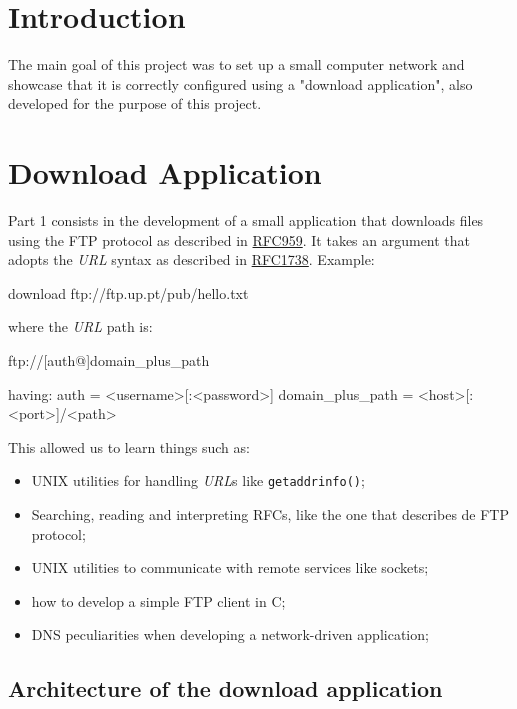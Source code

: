 \section{Introduction}

The main goal of this project was to set up a small computer network and showcase that it is correctly configured using a "download application", also developed for the purpose of this project.

\section{Download Application}

Part 1 consists in the development of a small application that downloads files using the FTP protocol as described in \href{https://www.rfc-editor.org/rfc/rfc959}{RFC959}.
It takes an argument that adopts the \textit{URL} syntax as described in \href{https://www.rfc-editor.org/rfc/rfc1738}{RFC1738}. Example:

\begin{code-bash}
download ftp://ftp.up.pt/pub/hello.txt
\end{code-bash}

where the \textit{URL} path is:

\begin{code-bash}
ftp://[auth@]domain_plus_path

having:
auth = <username>[:<password>]
domain_plus_path = <host>[:<port>]/<path>
\end{code-bash}

This allowed us to learn things such as:
\begin{itemize}
    \item UNIX utilities for handling \textit{URL}s like \lstinline{getaddrinfo()};
    \item Searching, reading and interpreting RFCs, like the one that describes de FTP protocol;
    \item UNIX utilities to communicate with remote services like sockets;
    \item how to develop a simple FTP client in C;
    \item DNS peculiarities when developing a network-driven application;
\end{itemize}

\subsection{Architecture of the download application}

